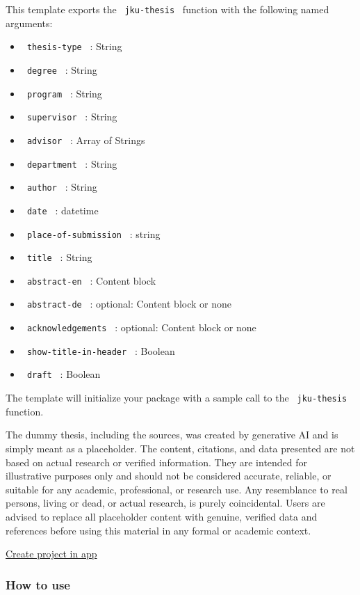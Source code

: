 This template exports the \texttt{\ jku-thesis\ } function with the
following named arguments:

\begin{itemize}
\tightlist
\item
  \texttt{\ thesis-type\ } : String
\item
  \texttt{\ degree\ } : String
\item
  \texttt{\ program\ } : String
\item
  \texttt{\ supervisor\ } : String
\item
  \texttt{\ advisor\ } : Array of Strings
\item
  \texttt{\ department\ } : String
\item
  \texttt{\ author\ } : String
\item
  \texttt{\ date\ } : datetime
\item
  \texttt{\ place-of-submission\ } : string
\item
  \texttt{\ title\ } : String
\item
  \texttt{\ abstract-en\ } : Content block
\item
  \texttt{\ abstract-de\ } : optional: Content block or none
\item
  \texttt{\ acknowledgements\ } : optional: Content block or none
\item
  \texttt{\ show-title-in-header\ } : Boolean
\item
  \texttt{\ draft\ } : Boolean
\end{itemize}

The template will initialize your package with a sample call to the
\texttt{\ jku-thesis\ } function.

The dummy thesis, including the sources, was created by generative AI
and is simply meant as a placeholder. The content, citations, and data
presented are not based on actual research or verified information. They
are intended for illustrative purposes only and should not be considered
accurate, reliable, or suitable for any academic, professional, or
research use. Any resemblance to real persons, living or dead, or actual
research, is purely coincidental. Users are advised to replace all
placeholder content with genuine, verified data and references before
using this material in any formal or academic context.

\href{/app?template=not-jku-thesis&version=0.1.0}{Create project in app}

\subsubsection{How to use}\label{how-to-use}

